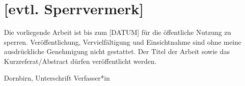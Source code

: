 \documentclass[a4paper,12pt,twoside]{scrreprt}
\begin{document}
\thispagestyle{empty}


\section*{[evtl. Sperrvermerk]}   %
Die vorliegende Arbeit ist bis zum [DATUM] für die öffentliche Nutzung zu sperren. Veröffentlichung, Vervielfältigung und Einsichtnahme sind ohne meine ausdrückliche Genehmigung nicht gestattet. Der Titel der Arbeit sowie das Kurzreferat/Abstract dürfen veröffentlicht werden.

\vspace{3cm}

\noindent Dornbirn, \hfill Unterschrift Verfasser*in
\end{document}
